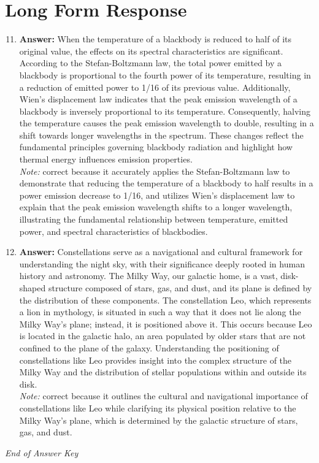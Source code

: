 \documentclass[12pt]{article}
\begin{document}
\section*{Long Form Response}
\begin{enumerate}[label=\arabic*.]
\setcounter{enumi}{10}
\item \textbf{Answer:} When the temperature of a blackbody is reduced to half of its original value, the effects on its spectral characteristics are significant. According to the Stefan-Boltzmann law, the total power emitted by a blackbody is proportional to the fourth power of its temperature, resulting in a reduction of emitted power to 1/16 of its previous value. Additionally, Wien's displacement law indicates that the peak emission wavelength of a blackbody is inversely proportional to its temperature. Consequently, halving the temperature causes the peak emission wavelength to double, resulting in a shift towards longer wavelengths in the spectrum. These changes reflect the fundamental principles governing blackbody radiation and highlight how thermal energy influences emission properties.
\\ \textit{Note:} correct because it accurately applies the Stefan-Boltzmann law to demonstrate that reducing the temperature of a blackbody to half results in a power emission decrease to 1/16, and utilizes Wien's displacement law to explain that the peak emission wavelength shifts to a longer wavelength, illustrating the fundamental relationship between temperature, emitted power, and spectral characteristics of blackbodies.
\item \textbf{Answer:} Constellations serve as a navigational and cultural framework for understanding the night sky, with their significance deeply rooted in human history and astronomy. The Milky Way, our galactic home, is a vast, disk-shaped structure composed of stars, gas, and dust, and its plane is defined by the distribution of these components. The constellation Leo, which represents a lion in mythology, is situated in such a way that it does not lie along the Milky Way's plane; instead, it is positioned above it. This occurs because Leo is located in the galactic halo, an area populated by older stars that are not confined to the plane of the galaxy. Understanding the positioning of constellations like Leo provides insight into the complex structure of the Milky Way and the distribution of stellar populations within and outside its disk.
\\ \textit{Note:} correct because it outlines the cultural and navigational importance of constellations like Leo while clarifying its physical position relative to the Milky Way's plane, which is determined by the galactic structure of stars, gas, and dust.
\end{enumerate}

\vfill
\noindent\textit{End of Answer Key}
\end{document}
